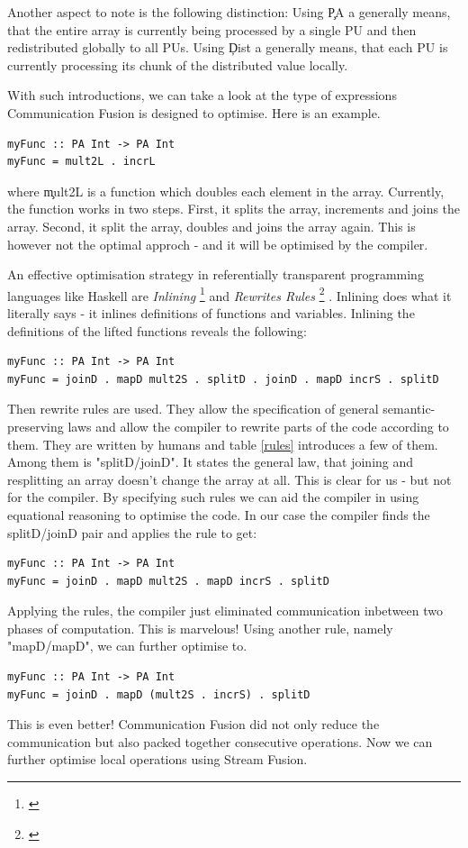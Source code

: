     Another aspect to note is the following distinction:
    Using \c{PA a} generally means, that the entire array
    is currently being processed by a single PU and
    then redistributed globally to all PUs.
    Using \c{Dist a} generally means,
    that each PU is currently processing its
    chunk of the distributed value locally.
    
    With such introductions, we can take a look at the type of expressions
    Communication Fusion is designed to optimise. Here is an example.
    \begin{lstlisting}
myFunc :: PA Int -> PA Int
myFunc = mult2L . incrL
    \end{lstlisting}
    where \c{mult2L} is a function which doubles each element in the array.
    Currently, the function works in two steps. First, it splits
    the array, increments and joins the array. Second, it split
    the array, doubles and joins the array again. This is however
    not the optimal approch - and it will be optimised by the compiler.
    
    An effective optimisation strategy in referentially transparent
    programming languages like Haskell are \emph{Inlining}
    \footnote{\cite{Inlining2002}}
    and \emph{Rewrites Rules}
    \footnote{\cite{Simon2001Rewrites}}
    .
    Inlining does what it literally says - it inlines definitions
    of functions and variables. Inlining the definitions
    of the lifted functions reveals the following:
    \begin{lstlisting}
myFunc :: PA Int -> PA Int
myFunc = joinD . mapD mult2S . splitD . joinD . mapD incrS . splitD
    \end{lstlisting}
    Then rewrite rules are used.
    They allow the specification of general semantic-preserving
    laws and allow the compiler to rewrite parts of the code
    according to them.
    They are written by humans and table \ref{rules} introduces a few of them.
    Among them is "splitD/joinD". It states the general law,
    that joining and resplitting an array doesn't change the array at all.
    This is clear for us - but not for the compiler. By specifying such rules
    we can aid the compiler in using equational reasoning to
    optimise the code. In our case the compiler finds the splitD/joinD pair and applies the rule to get:
    \begin{lstlisting}
myFunc :: PA Int -> PA Int
myFunc = joinD . mapD mult2S . mapD incrS . splitD
    \end{lstlisting}
    Applying the rules, the compiler just eliminated
    communication inbetween two phases of computation. This is marvelous!
    Using another rule, namely "mapD/mapD", we can further optimise to.
    \begin{lstlisting}
myFunc :: PA Int -> PA Int
myFunc = joinD . mapD (mult2S . incrS) . splitD
    \end{lstlisting}
    This is even better!
    Communication Fusion did not only reduce the communication but also
    packed together consecutive operations. Now we can further
    optimise local operations using Stream Fusion.
    
